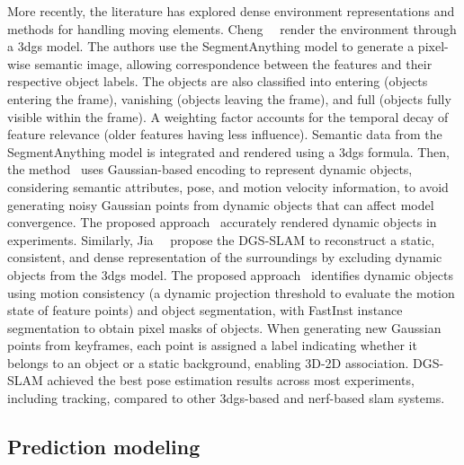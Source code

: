 More recently, the literature has explored dense environment
representations and methods for handling moving elements.
Cheng~\etal~\cite{cheng:ral:2025} render the environment
through a \gls{3dgs} model. The authors use the SegmentAnything model
to generate a pixel-wise semantic image,
allowing correspondence between the features and their respective object labels.
The objects are also classified into entering (objects entering the frame),
vanishing (objects leaving the frame), and
full (objects fully visible within the frame).
A weighting factor accounts for the temporal decay of feature relevance
(older features having less influence). Semantic data from the SegmentAnything
model is integrated and rendered using a \gls{3dgs} formula.
Then, the method~\cite{cheng:ral:2025} uses Gaussian-based encoding
to represent dynamic objects, considering semantic attributes, pose, and
motion velocity information, to avoid generating noisy Gaussian points
from dynamic objects that can affect model convergence.
The proposed approach~\cite{cheng:ral:2025} accurately rendered
dynamic objects in experiments.
Similarly, Jia~\etal~\cite{jia:tcsvt:2025} propose the DGS-SLAM
to reconstruct a static, consistent, and dense representation of
the surroundings by excluding dynamic objects from the \gls{3dgs} model.
The proposed approach~\cite{jia:tcsvt:2025} identifies dynamic objects
using motion consistency (a dynamic projection threshold
to evaluate the motion state of feature points) and object segmentation,
with FastInst instance segmentation to obtain pixel masks of objects.
When generating new Gaussian points from keyframes,
each point is assigned a label indicating whether it belongs to an object
or a static background, enabling 3D-2D association.
DGS-SLAM achieved the best pose estimation results across most experiments,
including tracking, compared to other
\gls{3dgs}-based and \gls{nerf}-based \gls{slam} systems.

\subsection{Prediction modeling}

